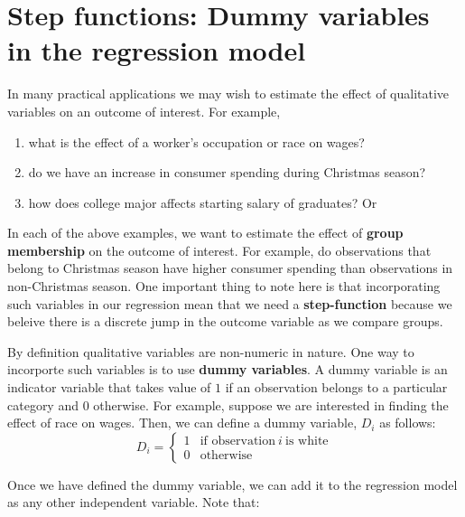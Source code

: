 \documentclass[
]{book}
\theoremstyle{definition}
\theoremstyle{definition}
\theoremstyle{definition}
\theoremstyle{definition}
\theoremstyle{remark}
\begin{document}
\hypertarget{step-functions-dummy-variables-in-the-regression-model}{%
\section{Step functions: Dummy variables in the regression model}\label{step-functions-dummy-variables-in-the-regression-model}}

In many practical applications we may wish to estimate the effect of qualitative variables on an outcome of interest. For example,

\begin{enumerate}
\def\labelenumi{\alph{enumi}.}
\item
  what is the effect of a worker's occupation or race on wages?
\item
  do we have an increase in consumer spending during Christmas season?
\item
  how does college major affects starting salary of graduates? Or
\end{enumerate}

In each of the above examples, we want to estimate the effect of \textbf{group membership} on the outcome of interest. For example, do observations that belong to Christmas season have higher consumer spending than observations in non-Christmas season. One important thing to note here is that incorporating such variables in our regression mean that we need a \textbf{step-function} because we beleive there is a discrete jump in the outcome variable as we compare groups.

By definition qualitative variables are non-numeric in nature. One way to incorporte such variables is to use \textbf{dummy variables}. A dummy variable is an indicator variable that takes value of \(1\)
if an observation belongs to a particular category and \(0\) otherwise. For example, suppose we are interested in finding the effect of race on wages. Then, we can define a dummy variable, \(D_i\) as follows:
\[D_i= \begin{cases}
1 & \text{if observation} \ i \ \text{is white} \\
0 & \text{otherwise}
\end{cases}\]

Once we have defined the dummy variable, we can add it to the regression model as any other independent variable. Note that:
\end{document}
